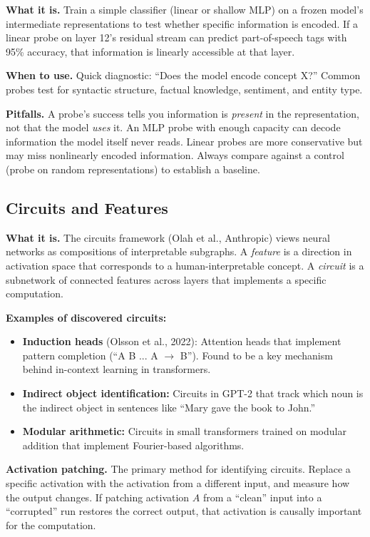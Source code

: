 \textbf{What it is.} Train a simple classifier (linear or shallow MLP) on a frozen model's intermediate representations to test whether specific information is encoded. If a linear probe on layer 12's residual stream can predict part-of-speech tags with 95\% accuracy, that information is linearly accessible at that layer.

\textbf{When to use.} Quick diagnostic: ``Does the model encode concept X?'' Common probes test for syntactic structure, factual knowledge, sentiment, and entity type.

\textbf{Pitfalls.} A probe's success tells you information is \textit{present} in the representation, not that the model \textit{uses} it. An MLP probe with enough capacity can decode information the model itself never reads. Linear probes are more conservative but may miss nonlinearly encoded information. Always compare against a control (probe on random representations) to establish a baseline.

\subsection{Circuits and Features}

\textbf{What it is.} The circuits framework (Olah et al., Anthropic) views neural networks as compositions of interpretable subgraphs. A \textit{feature} is a direction in activation space that corresponds to a human-interpretable concept. A \textit{circuit} is a subnetwork of connected features across layers that implements a specific computation.

\textbf{Examples of discovered circuits:}
\begin{itemize}
    \item \textbf{Induction heads} (Olsson et al., 2022): Attention heads that implement pattern completion (``A B ... A $\rightarrow$ B''). Found to be a key mechanism behind in-context learning in transformers.
    \item \textbf{Indirect object identification:} Circuits in GPT-2 that track which noun is the indirect object in sentences like ``Mary gave the book to John.''
    \item \textbf{Modular arithmetic:} Circuits in small transformers trained on modular addition that implement Fourier-based algorithms.
\end{itemize}

\textbf{Activation patching.} The primary method for identifying circuits. Replace a specific activation with the activation from a different input, and measure how the output changes. If patching activation $A$ from a ``clean'' input into a ``corrupted'' run restores the correct output, that activation is causally important for the computation.

